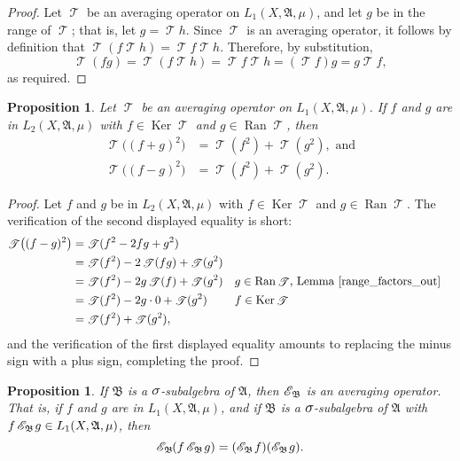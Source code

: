 \documentclass[
twoside=true,
paper=letter,
fontsize=9pt,
pagesize=auto,
leqno,
openany,
headsepline,
overfullrule,
]{scrbook}
\theoremstyle{plain}
\theoremstyle{plain}
\newtheorem{prop}[thm]{Proposition}
\theoremstyle{definition}
\theoremstyle{bfnoteitalic}
\theoremstyle{bfnoteroman}
\newcommand{\sigalg}[1]{\mathfrak{#1}}
\newcommand{\cali}[1]{\mathscr{#1}}
\DeclareMathOperator{\range}{Ran}
\DeclareMathOperator{\kernel}{Ker}
\newcommand{\condexpsub}[2]
{\mathop{\cali{E}\hspace{-1.5pt}}\nolimits_{#2}\hspace{-1pt}#1}
\newcommand{\condexpop}[1]{\mathop{\cali{E}\hspace{-1pt}}\nolimits_{#1}}
\newcommand{\textsigma}{\hbox{\large{$\sigma$}}\kern-1pt}
\newcommand{\sigmaalgebra}{\sigalg{A}}
\newcommand{\sigmaalgebraii}{\sigalg{B}}
\newcommand{\Lone}{L_1(\measurespace, \sigmaalgebra, \measure)}
\newcommand{\Ltwo}{L_2(\measurespace, \sigmaalgebra, \measure)}
\newcommand{\OpT}{\mathop{\cali T}}
\newcommand{\function}{f}
\newcommand{\functionii}{g}
\newcommand{\functioniii}{h}
\newcommand{\measurespace}{X}
\newcommand{\measure}{\mu}
\begin{document}
\begin{proof}
Let $\OpT$ be an averaging operator on $\Lone$, and let $\functionii$ be in the range of $\OpT$; that is, let $\functionii = \OpT \functioniii$. Since $\OpT$ is an averaging operator, it follows by definition that
$ \OpT(\function\OpT \functioniii) = \OpT \function \OpT \functioniii $.  Therefore, by substitution, 
\[
\OpT(\function\functionii) = \OpT(\function\OpT \functioniii) = \OpT \function \OpT \functioniii 
= (\OpT \function)\functionii = \functionii\OpT \function,
\]
as required.
\end{proof}

\begin{prop}\label{averaging_bias_variance}
Let $\OpT$ be an averaging operator on $\Lone$.
If $\function$ and $\functionii$ are in $\Ltwo$ with $\function\in\kernel\OpT$ and $\functionii\in\range \OpT$,  then 
\begin{align*}
\OpT\bigl((\function+\functionii)^2\bigr)
& =
\OpT(\function^2) + \OpT(\functionii^2), \text{ and}
\\
\OpT\bigl((\function-\functionii)^2\bigr)
& =
\OpT(\function^2) + \OpT(\functionii^2).
\end{align*}
\end{prop}

\begin{proof}
Let $\function$ and $\functionii$ be in $\Ltwo$ with $\function\in\kernel\OpT$ and $\functionii\in\range\OpT$.
The verification of the second displayed equality is short:
\begin{align*}
\OpT \bigl( (\function-\functionii)^2 \bigr)
& = \OpT(\function^2 -2\function\functionii +\functionii^2)\\
& = \OpT(\function^2) - 2\OpT(\function\functionii) + \OpT(\functionii^2)\\
& = \OpT(\function^2) - 2\functionii\OpT(\function) +\OpT(\functionii^2)
&& \text{$\functionii\in\range\OpT$, Lemma~\ref{range_factors_out}}\\
& = \OpT(\function^2) - 2\functionii\cdot 0 +\OpT(\functionii^2)
&& \text{$\function\in\kernel\OpT$}\\
& = \OpT(\function^2) + \OpT(\functionii^2),
\end{align*}
and the verification of the first displayed equality amounts to replacing the minus sign with a plus sign, completing the proof.
\end{proof}



\begin{prop}\label{averaging_operator}
If $\sigmaalgebraii$ is a $\textsigma$-subalgebra of $\sigmaalgebra$, then
$\condexpop{\sigmaalgebraii}$ is an averaging operator.  That is, if $\function$ and $\functionii$ are  in $\Lone$, and if $\sigmaalgebraii$ is a $\textsigma$-subalgebra of $\sigmaalgebra$ with
$\function\condexpsub{\functionii}{\sigmaalgebraii}\in\Lone$, then 
\[
\condexpsub{(\function\condexpsub{\functionii}{\sigmaalgebraii})}{\sigmaalgebraii}
=
(\condexpsub{\function}{\sigmaalgebraii})( \condexpsub{\functionii}{\sigmaalgebraii}).
\]
\end{prop}
\end{document}

